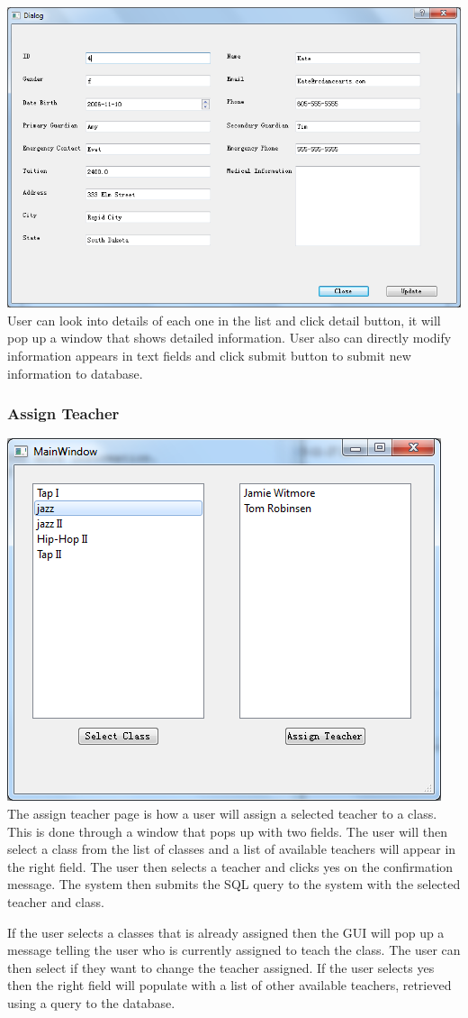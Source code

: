 \includegraphics[scale=0.5]{pics/detail.png}\\
User can look into details of each one in the list and click detail button, it will pop up a window that shows detailed information. User also can directly modify information appears in text fields and click submit button to submit new information to database.
\subsubsection{Assign Teacher}
\includegraphics[scale=0.5]{pics/assign_teacher.png}\\
The assign teacher page is how a user will assign a selected teacher to a class. This is done through a window that pops up with two fields. The user will then select a class from the list of classes and a list of available teachers will appear in the right field. The user then selects a teacher and clicks yes on the confirmation message. The system then submits the SQL query to the system with the selected teacher and class. 

If the user selects a classes that is already assigned then the GUI will pop up a message telling the user who is currently assigned to teach the class. The user can then select if they want to change the teacher assigned. If the user selects yes then the right field will populate with a list of other available teachers, retrieved using a query to the database.
